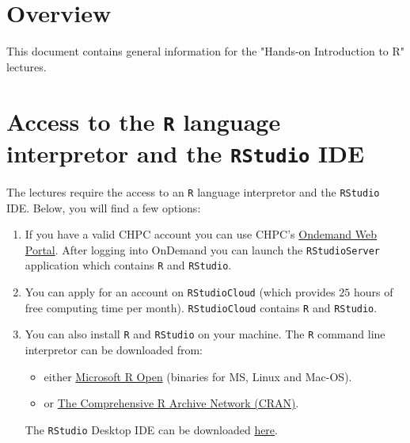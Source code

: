 \section*{Overview}

This document contains general information for the "Hands-on Introduction to R" lectures.\newline

\section{Access to the \texttt{R} language interpretor and the \texttt{RStudio} IDE}

The lectures require the access to an \texttt{R} language interpretor and the \texttt{RStudio} IDE.
Below, you will find a few options:

\begin{enumerate}
\item If you have a valid CHPC account you can use CHPC's \href{http://ondemand.chpc.utah.edu/}{Ondemand Web Portal}.\newline
      After logging into OnDemand you can launch the \texttt{RStudioServer} application which contains \texttt{R} and \texttt{RStudio}.

\item You can apply for an account on \texttt{RStudioCloud} (which provides $25$ hours of free computing time per month).\newline
      \texttt{RStudioCloud} contains \texttt{R} and \texttt{RStudio}. 

\item You can also install \texttt{R} and \texttt{RStudio} on your machine.\newline
      The \texttt{R} command line interpretor can be downloaded from:
      \begin{itemize}
	      \item either \href{https://mran.microsoft.com/}{Microsoft R Open} (binaries for MS, Linux and Mac-OS).
  	 \item or \href{https://cran.r-project.org/}{The Comprehensive R Archive Network (CRAN)}.
      \end{itemize}			

      The \texttt{RStudio} Desktop IDE can be downloaded \href{https://www.rstudio.com/products/rstudio/download/}{here}.

\end{enumerate}



